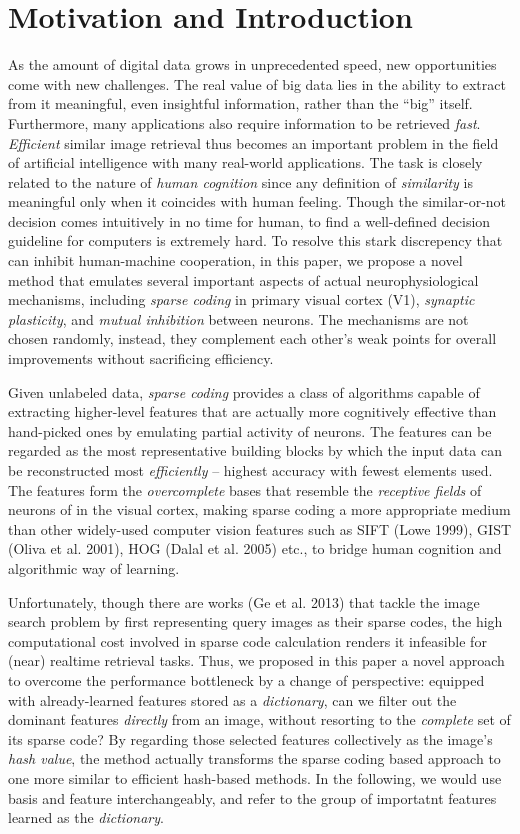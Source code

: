 \documentclass[letterpaper]{article}
\begin{document}
\section{Motivation and Introduction}
As the amount of digital data grows in unprecedented speed, new opportunities come with new challenges. The real value of big data lies in the ability to extract from it meaningful, even insightful information, rather than the ``big'' itself. Furthermore, many applications also require information to be retrieved \emph{fast}.
\emph{Efficient} similar image retrieval thus becomes an important problem in the field of artificial intelligence with many real-world applications. 
The task is closely related to the nature of \emph{human cognition} since any definition of \emph{similarity} is meaningful only when it coincides with human feeling. Though the similar-or-not decision comes intuitively in no time for human, to find a well-defined decision guideline for computers is extremely hard. To resolve this stark discrepency that can inhibit human-machine cooperation, in this paper, we propose a novel 
method %
that emulates several important aspects of actual neurophysiological mechanisms, including \emph{sparse coding} in primary visual cortex (V1), \emph{synaptic plasticity}, and \emph{mutual inhibition} between neurons. The mechanisms are not chosen randomly, instead, they complement each other's weak points for overall improvements without sacrificing efficiency.

Given unlabeled data, \emph{sparse coding} provides a class of algorithms capable of extracting higher-level features that are actually more cognitively effective than hand-picked ones by emulating partial activity of neurons. The features can be regarded as the most representative building blocks by which the input data can be reconstructed most \emph{efficiently} -- highest accuracy with fewest elements used. The features form the \emph{overcomplete} bases that resemble the \emph{receptive fields} of neurons of in the visual cortex, making sparse coding a more appropriate medium than other widely-used computer vision features such as SIFT (Lowe 1999), GIST (Oliva et al. 2001), HOG (Dalal et al. 2005) etc., to bridge human cognition and algorithmic way of learning.

Unfortunately, though there are works (Ge et al. 2013) that tackle the image search problem by first representing query images as their sparse codes, the high computational cost involved in sparse code calculation renders it infeasible for (near) realtime retrieval tasks. Thus, we proposed in this paper a novel approach to overcome the performance bottleneck by a change of perspective: equipped with already-learned features stored as a \emph{dictionary}, can we filter out the dominant features \emph{directly} from an image, without resorting to the \emph{complete} set of its sparse code? By regarding those selected features collectively as the image's \emph{hash value}, the method actually transforms the sparse coding based approach to one more similar to efficient hash-based methods. In the following, we would use basis and feature interchangeably, and refer to the group of importatnt features learned as the \emph{dictionary}.
\end{document}
